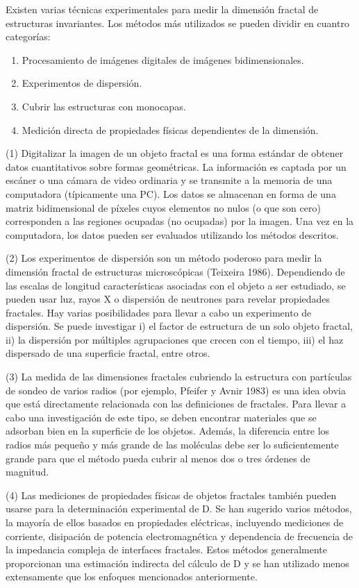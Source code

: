 \documentclass[11pt]{article}
\begin{document}
Existen varias técnicas experimentales para medir la dimensión fractal de estructuras invariantes. Los métodos más utilizados se pueden dividir en cuantro categorías:

\begin{enumerate}
\item Procesamiento de imágenes digitales de imágenes bidimensionales.
\item Experimentos de dispersión.
\item Cubrir las estructuras con monocapas. 
\item Medición directa de propiedades físicas dependientes de la dimensión.
\end{enumerate}

(1) Digitalizar la imagen de un objeto fractal es una forma estándar de obtener datos cuantitativos sobre formas geométricas. La información es captada por un escáner o una cámara de video ordinaria y se transmite a la memoria de una computadora (típicamente una PC). Los datos se almacenan en forma de una matriz bidimensional de píxeles cuyos elementos no nulos (o que son cero) corresponden a las regiones ocupadas (no ocupadas) por la imagen. Una vez en la computadora, los datos pueden ser evaluados utilizando los métodos descritos.

(2) Los experimentos de dispersión son un método poderoso para medir la dimensión fractal de estructuras microscópicas (Teixeira 1986). Dependiendo de las escalas de longitud características asociadas con el objeto a ser estudiado, se pueden usar luz, rayos X o dispersión de neutrones para revelar propiedades fractales. Hay varias posibilidades para llevar a cabo un experimento de dispersión. Se puede investigar i) el factor de estructura de un solo objeto fractal, ii) la dispersión por múltiples agrupaciones que crecen con el tiempo, iii) el haz dispersado de una superficie fractal, entre otros.

(3) La medida de las dimensiones fractales cubriendo la estructura con partículas de sondeo de varios radios (por ejemplo, Pfeifer y Avnir 1983) es una idea obvia que está directamente relacionada con las definiciones de fractales. Para llevar a cabo una investigación de este tipo, se deben encontrar materiales que se adsorban bien en la superficie de los objetos. Además, la diferencia entre los radios más pequeño y más grande de las moléculas debe ser lo suficientemente grande para que el método pueda cubrir al menos dos o tres órdenes de magnitud.


(4) Las mediciones de propiedades físicas de objetos fractales también pueden usarse para la determinación experimental de D. Se han sugerido varios métodos, la mayoría de ellos basados en propiedades eléctricas, incluyendo mediciones de corriente, disipación de potencia electromagnética y dependencia de frecuencia de la impedancia compleja de interfaces fractales. Estos métodos generalmente proporcionan una estimación indirecta del cálculo de D y se han utilizado menos extensamente que los enfoques mencionados anteriormente.
\end{document}
